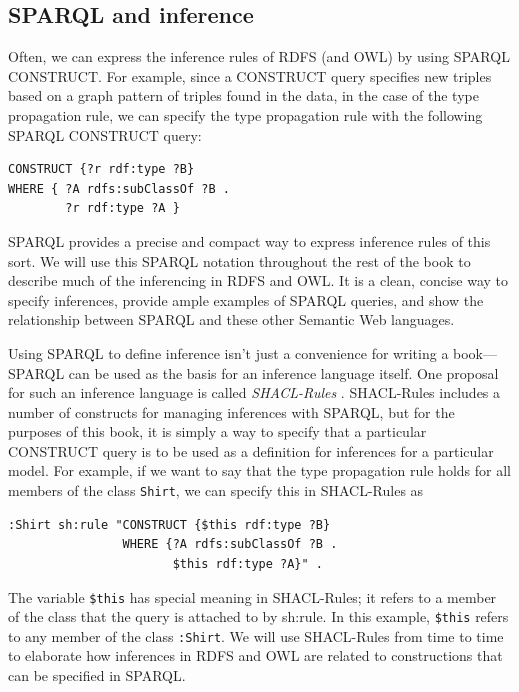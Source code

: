 \subsection{SPARQL and inference}
\label{shacl-rules}
Often, we can express the inference rules of RDFS (and OWL) by using
SPARQL CONSTRUCT. For example, since a CONSTRUCT query specifies new
triples based on a graph pattern of triples found in
the data, in the case of the type propagation rule, we can specify the
type propagation rule with the following SPARQL CONSTRUCT query:

\begin{lstlisting}
CONSTRUCT {?r rdf:type ?B}
WHERE { ?A rdfs:subClassOf ?B .
        ?r rdf:type ?A }
\end{lstlisting}

SPARQL provides a precise and compact way to express inference rules of
this sort. We will use this SPARQL notation throughout the rest of the
book to describe much of the inferencing in RDFS and OWL. It is a clean,
concise way to specify inferences, provide ample examples of SPARQL
queries, and show the relationship between SPARQL and these other
Semantic Web languages.

Using SPARQL to define inference isn't just a convenience for writing a
book---SPARQL can be used as the basis for an inference language itself.
One proposal for such an inference language is called 
\emph{SHACL-Rules} \cite{Steyskal:17:SAF}. 
SHACL-Rules includes a number of constructs for managing
inferences with SPARQL, but for the purposes of this book, it is
simply a way to specify that a particular CONSTRUCT query is to be used
as a definition for inferences for a particular model. For example, if
we want to say that the type propagation rule holds for all members of
the class \texttt{Shirt}, we can specify this in SHACL-Rules as

\begin{lstlisting}
:Shirt sh:rule "CONSTRUCT {$this rdf:type ?B}
                WHERE {?A rdfs:subClassOf ?B .
                       $this rdf:type ?A}" .
\end{lstlisting}

The variable \texttt{\$this} has special meaning in SHACL-Rules; 
it refers to a member of
the class that the query is attached to by sh:rule. In this example,
\texttt{\$this} refers to any member of the class \texttt{:Shirt}. 
We will use SHACL-Rules from
time to time to elaborate how inferences in RDFS and OWL are related to
constructions that can be specified in SPARQL.

